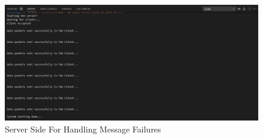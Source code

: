 \documentclass[11pt]{article}
\begin{document}
\begin{figure}[!h]
\centering
\includegraphics[width=\textwidth]{message_server.png}
\caption{Server Side For Handling Message Failures}
\end{figure}
\end{document}
